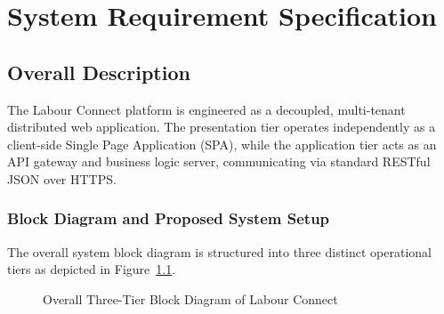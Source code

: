 \newpage
\chapter{System Requirement Specification}

\section{Overall Description}
The Labour Connect platform is engineered as a decoupled, multi-tenant distributed web application. The presentation tier operates independently as a client-side Single Page Application (SPA), while the application tier acts as an API gateway and business logic server, communicating via standard RESTful JSON over HTTPS.

\subsection{Block Diagram and Proposed System Setup}
The overall system block diagram is structured into three distinct operational tiers as depicted in Figure~\ref{fig:block_diagram}.

\begin{figure}[h!]
\centering
\begin{center}
\end{center}
\caption{Overall Three-Tier Block Diagram of Labour Connect}\label{fig:block_diagram}
\end{figure}

